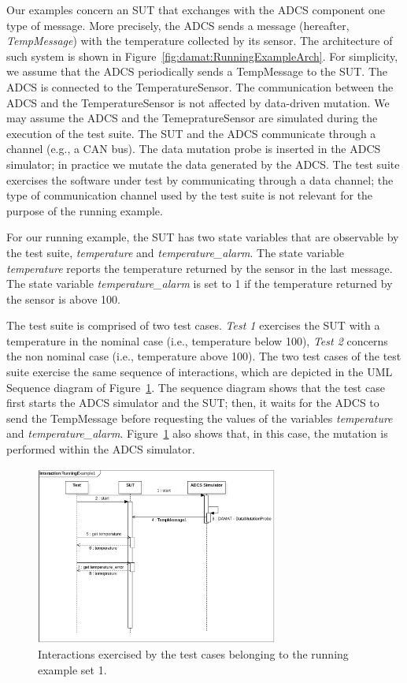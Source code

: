 Our examples concern an SUT that exchanges with the ADCS component one type of message. More precisely, the ADCS sends a message (hereafter, \emph{TempMessage}) with the temperature collected by its sensor. The architecture of such system is shown in Figure~\ref{fig:damat:RunningExampleArch}. For simplicity, we assume that the ADCS periodically sends a TempMessage to the SUT. The ADCS is connected to the TemperatureSensor. The communication between the ADCS and the TemperatureSensor is not affected by data-driven mutation. We may assume the ADCS and the TemepratureSensor are simulated during the execution of the test suite. The SUT and the ADCS communicate through a channel 
(e.g., a CAN bus). The data mutation probe is inserted in the ADCS simulator; in practice we mutate the data generated by the ADCS. The test suite exercises the software under test by communicating through a data channel; the type of communication channel used by the test suite is not relevant for the purpose of the running example.

For our running example, the SUT has two state variables that are observable by the test suite, \emph{temperature} and \emph{temperature\_alarm}. The state variable \emph{temperature} reports the temperature returned by the sensor in the last message. 
The state variable \emph{temperature\_alarm} is set to 1 if the temperature returned by the sensor is above 100.

The test suite is comprised of two test cases. \emph{Test 1} exercises the SUT with a temperature in the nominal case (i.e., temperature below 100), \emph{Test 2} concerns the non nominal case (i.e., temperature above 100). The two test cases of the test suite exercise the same sequence of interactions, which are depicted in the UML Sequence diagram of Figure~\ref{fig:damat:RunningExample1Sequence}. The sequence diagram shows that the test case first starts the ADCS simulator and the SUT; then, it waits for the ADCS to send the TempMessage before requesting the values of the variables \emph{temperature} and \emph{temperature\_alarm}. Figure~\ref{fig:damat:RunningExample1Sequence} also shows that, in this case, the mutation is performed within the ADCS simulator.

\begin{figure}[tb]
\centering
\includegraphics[width=8cm]{damat/images/runningExamplesSequence1.png}
\caption{Interactions exercised by the test cases belonging to the running example set 1.}
\label{fig:damat:RunningExample1Sequence}
\end{figure}


